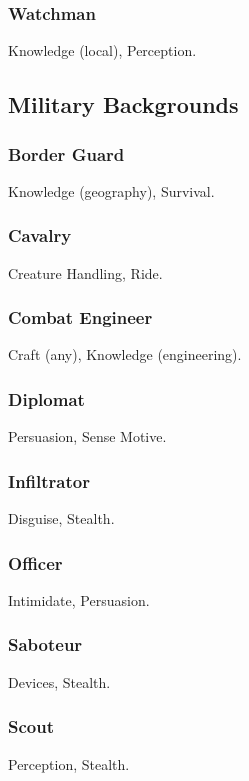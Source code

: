 \subsubsection{Watchman}
 Knowledge (local), Perception.

\subsection{Military Backgrounds}

\subsubsection{Border Guard}
 Knowledge (geography), Survival.

\subsubsection{Cavalry}
 Creature Handling, Ride.

\subsubsection{Combat Engineer}
 Craft (any), Knowledge (engineering).

\subsubsection{Diplomat}
 Persuasion, Sense Motive.

\subsubsection{Infiltrator}
 Disguise, Stealth.

\subsubsection{Officer}
 Intimidate, Persuasion.

\subsubsection{Saboteur}
 Devices, Stealth.

\subsubsection{Scout}
 Perception, Stealth.

